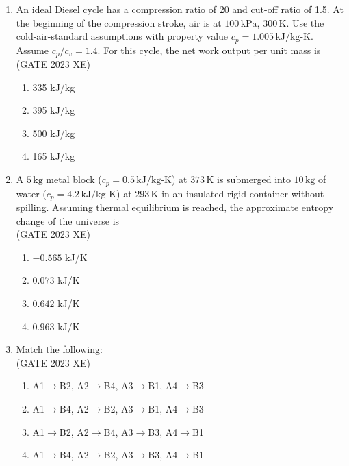 \documentclass[journal,12pt,onecolumn]{IEEEtran}
\begin{document}
\begin{enumerate}
\item An ideal Diesel cycle has a compression ratio of 20 and cut-off ratio of 1.5. At the beginning of the compression stroke, air is at $100\,\mathrm{kPa}$, $300\,\mathrm{K}$. Use the cold-air-standard assumptions with property value $c_p=1.005\,\mathrm{kJ/kg\text{-}K}$. Assume $c_p/c_v=1.4$. For this cycle, the net work output per unit mass is\\
\hfill{(GATE 2023 XE)}

\begin{multicols}{2}
\begin{enumerate}
\item 335 kJ/kg
\item 395 kJ/kg
\item 500 kJ/kg
\item 165 kJ/kg
\end{enumerate}
\end{multicols}



\item A $5\,\mathrm{kg}$ metal block ($c_p=0.5\,\mathrm{kJ/kg\text{-}K}$) at $373\,\mathrm{K}$ is submerged into $10\,\mathrm{kg}$ of water ($c_p=4.2\,\mathrm{kJ/kg\text{-}K}$) at $293\,\mathrm{K}$ in an insulated rigid container without spilling. Assuming thermal equilibrium is reached, the approximate entropy change of the universe is\\
\hfill{(GATE 2023 XE)}

\begin{multicols}{2}
\begin{enumerate}
\item $-0.565$ kJ/K
\item $0.073$ kJ/K
\item $0.642$ kJ/K
\item $0.963$ kJ/K
\end{enumerate}
\end{multicols}

\newpage


\item Match the following: \\



\hfill{(GATE 2023 XE)}

\begin{multicols}{2}
\begin{enumerate}
\item A1$\rightarrow$B2, A2$\rightarrow$B4, A3$\rightarrow$B1, A4$\rightarrow$B3
\item A1$\rightarrow$B4, A2$\rightarrow$B2, A3$\rightarrow$B1, A4$\rightarrow$B3
\item A1$\rightarrow$B2, A2$\rightarrow$B4, A3$\rightarrow$B3, A4$\rightarrow$B1
\item A1$\rightarrow$B4, A2$\rightarrow$B2, A3$\rightarrow$B3, A4$\rightarrow$B1
\end{enumerate}
\end{multicols}



\end{enumerate}
\end{document}
